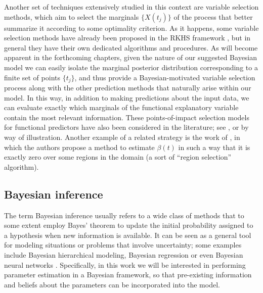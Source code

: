 Another set of techniques extensively studied in this context are variable selection methods, which aim to select the marginals \(\{X(t_j)\}\) of the process that better summarize it according to some optimality criterion. As it happens, some variable selection methods have already been proposed in the RKHS framework \citep[see for example][]{berrendero2019rkhs}, but in general they have their own dedicated algorithms and procedures. As will become apparent in the forthcoming chapters, given the nature of our suggested Bayesian model we can easily isolate the marginal posterior distribution corresponding to a finite set of points \(\{t_j\}\), and thus provide a Bayesian-motivated variable selection process along with the other prediction methods that naturally arise within our model. In this way, in addition to making predictions about the input data, we can evaluate exactly which marginals of the functional explanatory variable contain the most relevant information. These points-of-impact selection models for functional predictors have also been considered in the  literature; see \citet{poss2020superconsistent}, \citet{berrendero2016variable} or \citet{ferraty2010most} by way of illustration. Another example of a related strategy is the work of \citet{james2009functional}, in which the authors propose a method to estimate \(\beta(t)\) in such a way that it is exactly zero over some regions in the domain (a sort of ``region selection'' algorithm).

\subsection*{Bayesian inference}

The term Bayesian inference usually refers to a wide class of methods that to some extent employ Bayes' theorem to update the initial probability assigned to a hypothesis when new information is available. It can be seen as a general tool for modeling situations or problems that involve uncertainty; some examples include Bayesian hierarchical modeling, Bayesian regression or even Bayesian neural networks \citep[see e.g.][]{murphy2012machine, bishop2006pattern}. Specifically, in this work we will be interested in performing parameter estimation in a Bayesian framework, so that pre-existing information and beliefs about the parameters can be incorporated into the model.

